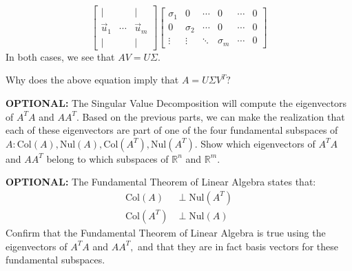 \begin{enumerate}
{$$     \begin{bmatrix} | & \ & | \\ \vec{u}_{1} & \cdots & \vec{u}_{m} \\ | & \ & | \end{bmatrix} \begin{bmatrix} \sigma_{1} & 0 & \cdots & 0 & \cdots & 0 \\ 0 & \sigma_{2} & \cdots & 0 & \cdots & 0 \\ \vdots & \vdots & \ddots & \sigma_{m} & \cdots&  0 \end{bmatrix}$$
    In both cases, we see that $AV = U\Sigma .$
  }

  \qitem Why does the above equation imply that $A = U \Sigma V^{T}?$


  \qitem \textbf{OPTIONAL:} The Singular Value Decomposition will compute the eigenvectors of $A^{T} A$ and $AA^{T}.$ 
  Based on the previous parts, we can make the realization that each of these eigenvectors are part of one of the four fundamental subspaces of $A: \text{Col}(A), \text{Nul}(A), \text{Col}(A^{T}), \text{Nul}(A^{T}).$
  Show which eigenvectors of $A^{T} A$ and $AA^{T}$ belong to which subspaces of $\mathbb{R}^{n}$ and $\mathbb{R}^{m}.$ 


  \qitem \textbf{OPTIONAL:} The Fundamental Theorem of Linear Algebra states that:
  \begin{align*}
    \text{Col}(A) &\perp \text{Nul}(A^{T}) \\
    \text{Col}(A^{T}) &\perp \text{Nul}(A)
  \end{align*}  
  Confirm that the Fundamental Theorem of Linear Algebra is true using the eigenvectors of $A^{T}A$ and $AA^{T},$ and that they are in fact basis vectors for these fundamental subspaces.


\end{enumerate}
